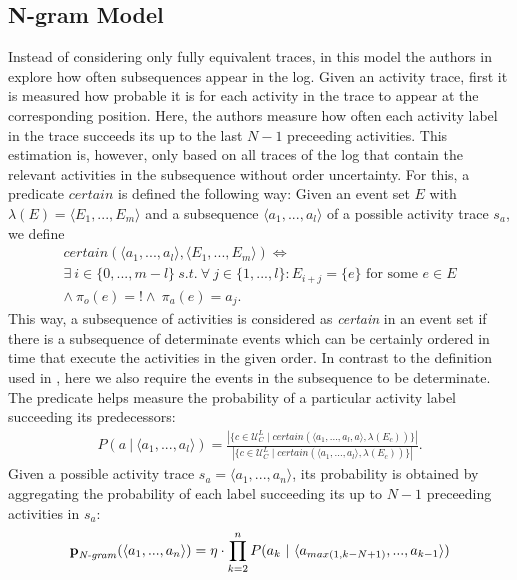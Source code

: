 \subsection{N-gram Model}
Instead of considering only fully equivalent traces, in this model the authors in \cite{por} explore how often subsequences appear in the log.
Given an activity trace, first it is measured how probable it is for each activity in the trace to appear at the corresponding position.
Here, the authors measure how often each activity label in the trace succeeds its up to the last $N-1$ preceeding activities.
This estimation is, however, only based on all traces of the log that contain the relevant activities in the subsequence without order uncertainty.
For this, a predicate $certain$ is defined the following way: 
Given an event set $E$ with $\lambda(E)=\langle E_1,...,E_m\rangle$ and a subsequence $\langle a_1,...,a_l\rangle$ of a possible activity trace $s_a$, we define
\begin{align*}
certain(\langle a_1,...,a_l \rangle, \langle E_1,...,E_m \rangle) \Leftrightarrow \\
\exists ~ i \in \{0,...,m-l\} ~ s.t.~
\forall ~ j \in \{1,...,l\}: E_{i+j} = \{e\} \text{ for some } e \in E \\ \wedge ~ \pi_o(e)=! \wedge ~ \pi_a(e)= a_j.
\end{align*}
This way, a subsequence of activities is considered as \textit{certain} in an event set if there is a subsequence of determinate events which can be certainly ordered in time that execute the activities in the given order.
In contrast to the definition used in \cite{por}, here we also require the events in the subsequence to be determinate.
The predicate helps measure the probability of a particular activity label succeeding its predecessors:
\begin{align*}
P(a ~ | ~ \langle a_1,...,a_l \rangle) = \frac{|\{c \in \mathcal{U}_C^L \mid
certain(\langle a_1,...,a_l,a \rangle, \lambda(E_c)) \}|}
{|\{c \in \mathcal{U}_C^L \mid
certain(\langle a_1,...,a_l \rangle, \lambda(E_c)) \}|}.
\end{align*}
Given a possible activity trace $s_a=\langle a_1,...,a_n\rangle$, its probability is obtained by aggregating the probability of each label succeeding its up to $N-1$ preceeding activities in $s_a$:
\begin{align*}
\textbf{p}_{\text{\textit{N-gram}}}(\langle a_1,...,a_n \rangle) =  \eta \cdot
\prod_{k=2}^n P(a_k ~ | ~ \langle a_{max(1,k-N+1)},..., a_{k-1}\rangle)
\end{align*}
